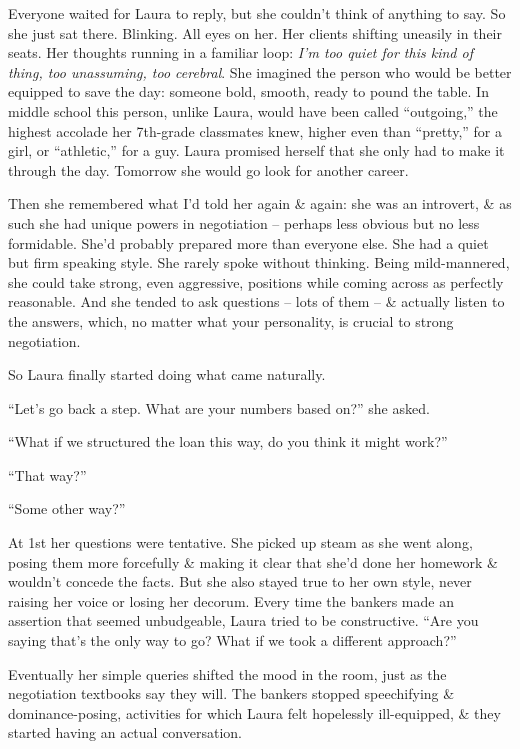 \documentclass{article}
\numberwithin{equation}{section}
\begin{document}
Everyone waited for Laura to reply, but she couldn't think of anything to say. So she just sat there. Blinking. All eyes on her. Her clients shifting uneasily in their seats. Her thoughts running in a familiar loop: \textit{I'm too quiet for this kind of thing, too unassuming, too cerebral}. She imagined the person who would be better equipped to save the day: someone bold, smooth, ready to pound the table. In middle school this person, unlike Laura, would have been called ``outgoing,'' the highest accolade her 7th-grade classmates knew, higher even than ``pretty,'' for a girl, or ``athletic,'' for a guy. Laura promised herself that she only had to make it through the day. Tomorrow she would go look for another career.

Then she remembered what I'd told her again \& again: she was an introvert, \& as such she had unique powers in negotiation -- perhaps less obvious but no less formidable. She'd probably prepared more than everyone else. She had a quiet but firm speaking style. She rarely spoke without thinking. Being mild-mannered, she could take strong, even aggressive, positions while coming across as perfectly reasonable. And she tended to ask questions -- lots of them -- \& actually listen to the answers, which, no matter what your personality, is crucial to strong negotiation.

So Laura finally started doing what came naturally.

``Let's go back a step. What are your numbers based on?'' she asked.

``What if we structured the loan this way, do you think it might work?''

``That way?''

``Some other way?''

At 1st her questions were tentative. She picked up steam as she went along, posing them more forcefully \& making it clear that she'd done her homework \& wouldn't concede the facts. But she also stayed true to her own style, never raising her voice or losing her decorum. Every time the bankers made an assertion that seemed unbudgeable, Laura tried to be constructive. ``Are you saying that's the only way to go? What if we took a different approach?''

Eventually her simple queries shifted the mood in the room, just as the negotiation textbooks say they will. The bankers stopped speechifying \& dominance-posing, activities for which Laura felt hopelessly ill-equipped, \& they started having an actual conversation.
\end{document}
